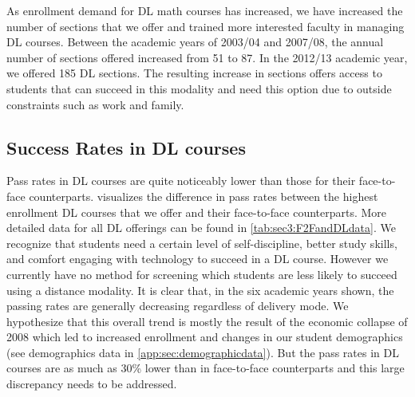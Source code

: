 As enrollment demand for DL math courses has increased, we have increased the number of sections that we offer and trained more interested faculty in managing DL courses.  Between the academic years of 2003/04 and 2007/08, the annual number of sections offered increased from 51 to 87.  In the 2012/13 academic year, we offered 185 DL sections.   The resulting increase in sections offers access to students that can succeed in this modality and need this option due to outside constraints such as work and family.


\subsection{Success Rates in DL courses}
Pass rates in DL courses are quite noticeably lower than those for their face-to-face counterparts.  visualizes the difference in pass rates between the highest enrollment DL courses that we offer and their face-to-face counterparts. More detailed data for all DL offerings can be found in \cref{tab:sec3:F2FandDLdata}. We recognize that students need a certain level of self-discipline, better study skills, and comfort engaging with technology to succeed in a DL course. However we currently have no method for screening which students are less likely to succeed using a distance modality.    It is clear that, in the six academic years shown, the passing rates are generally decreasing regardless of delivery mode.  We hypothesize that this overall trend is mostly the result of the economic collapse of 2008 which led to increased enrollment and changes in our student demographics (see demographics data in \vref{app:sec:demographicdata}).  But the pass rates in DL courses are as much as 30\% lower than in face-to-face counterparts and this large discrepancy needs to be addressed.


